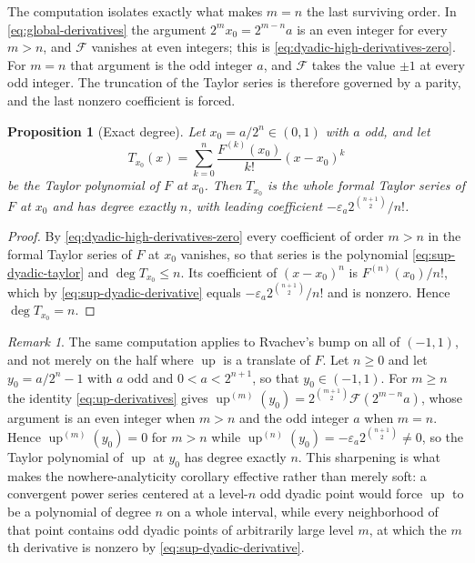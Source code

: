 \documentclass[11pt,oneside]{article}
\newtheorem{proposition}[theorem]{Proposition}
\theoremstyle{definition}
\theoremstyle{remark}
\newtheorem{remark}[theorem]{Remark}
\newcommand{\Up}{\operatorname{up}}
\begin{document}
The computation isolates exactly what makes $m=n$ the last surviving order.  In
\eqref{eq:global-derivatives} the argument $2^{m}x_0=2^{m-n}a$ is an even integer for every
$m>n$, and $\mathcal F$ vanishes at even integers; this is
\eqref{eq:dyadic-high-derivatives-zero}.  For $m=n$ that argument is the odd integer $a$, and
$\mathcal F$ takes the value $\pm1$ at every odd integer.  The truncation of the Taylor
series is therefore governed by a parity, and the last nonzero coefficient is forced.

\begin{proposition}[Exact degree]\label{thm:sup-taylor-degree}
Let $x_0=a/2^{n}\in(0,1)$ with $a$ odd, and let
\begin{equation}
 T_{x_0}(x)=\sum_{k=0}^{n}\frac{F^{(k)}(x_0)}{k!}(x-x_0)^{k} \label{eq:sup-dyadic-taylor}
\end{equation}
be the Taylor polynomial of $F$ at $x_0$.  Then $T_{x_0}$ is the whole formal Taylor series
of $F$ at $x_0$ and has degree exactly $n$, with leading coefficient
$-\varepsilon_a2^{\binom{n+1}{2}}/n!$.
\end{proposition}

\begin{proof}
By \eqref{eq:dyadic-high-derivatives-zero} every coefficient of order $m>n$ in the formal
Taylor series of $F$ at $x_0$ vanishes, so that series is the polynomial
\eqref{eq:sup-dyadic-taylor} and $\deg T_{x_0}\le n$.  Its coefficient of $(x-x_0)^{n}$ is
$F^{(n)}(x_0)/n!$, which by \eqref{eq:sup-dyadic-derivative} equals
$-\varepsilon_a2^{\binom{n+1}{2}}/n!$ and is nonzero.  Hence $\deg T_{x_0}=n$.
\end{proof}

\begin{remark}
The same computation applies to Rvachev's bump on all of $(-1,1)$, and not merely on the
half where $\Up$ is a translate of $F$.  Let $n\ge0$ and let $y_0=a/2^{n}-1$ with $a$ odd
and $0<a<2^{n+1}$, so that $y_0\in(-1,1)$.  For $m\ge n$ the identity
\eqref{eq:up-derivatives} gives
$\Up^{(m)}(y_0)=2^{\binom{m+1}{2}}\mathcal F(2^{m-n}a)$, whose argument is an even integer
when $m>n$ and the odd integer $a$ when $m=n$.  Hence $\Up^{(m)}(y_0)=0$ for $m>n$ while
$\Up^{(n)}(y_0)=-\varepsilon_a2^{\binom{n+1}{2}}\ne0$, so the Taylor polynomial of $\Up$ at
$y_0$ has degree exactly $n$.  This sharpening is what makes the nowhere-analyticity
corollary effective rather than merely soft: a convergent power series centered at a level-$n$
odd dyadic point would force $\Up$ to be a polynomial of degree $n$ on a whole interval,
while every neighborhood of that point contains odd dyadic points of arbitrarily large level
$m$, at which the $m$th derivative is nonzero by \eqref{eq:sup-dyadic-derivative}.
\end{remark}
\end{document}
